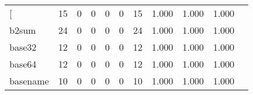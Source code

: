 \begin{longtable}{lp{1.2cm}p{1.2cm}p{1.2cm}p{1.2cm}p{1.2cm}p{1.2cm}p{1.2cm}p{1.2cm}p{1.2cm}p{1.2cm}}
\bottomrule
\endlastfoot
{[}         &                                    15 &                                                  0 &                                                  0 &                                                  0 &                                                  0 &                                                 15 &                                              1.000 &                                              1.000 &                                              1.000 \\
b2sum     &                                    24 &                                                  0 &                                                  0 &                                                  0 &                                                  0 &                                                 24 &                                              1.000 &                                              1.000 &                                              1.000 \\
base32    &                                    12 &                                                  0 &                                                  0 &                                                  0 &                                                  0 &                                                 12 &                                              1.000 &                                              1.000 &                                              1.000 \\
base64    &                                    12 &                                                  0 &                                                  0 &                                                  0 &                                                  0 &                                                 12 &                                              1.000 &                                              1.000 &                                              1.000 \\
basename  &                                    10 &                                                  0 &                                                  0 &                                                  0 &                                                  0 &                                                 10 &                                              1.000 &                                              1.000 &                                              1.000 \\

\end{longtable}

